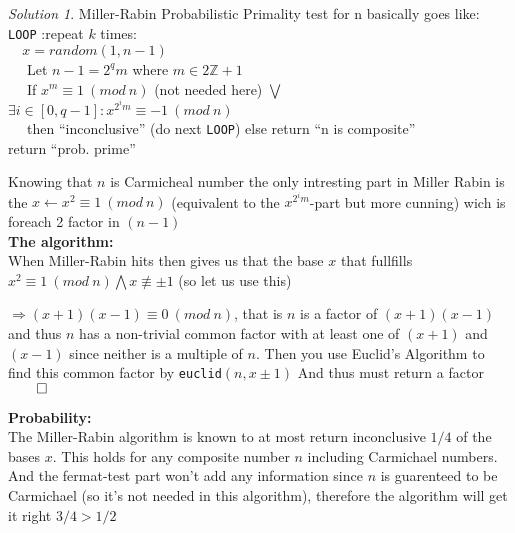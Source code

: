\documentclass[a4paper,twoside=false,abstract=false,numbers=noenddot,
titlepage=false,headings=small,parskip=half,version=last]{scrartcl}
\theoremstyle{definition}
\theoremstyle{remark}
\newtheorem*{solution}{Solution}
\newcommand{\ZZ}{\ensuremath{\mathbb{Z}}}
\begin{document}
\begin{solution}
   Miller-Rabin Probabilistic Primality test for n basically goes like: \\
   \verb+LOOP+ :repeat $k$ times:\\
   \verb+  + $x = random(1,n-1)$ \\
   \verb+  + Let $n-1 = 2^qm$ where $m \in 2\ZZ+1$ \\
   \verb+  + If $x^m \equiv 1 \ (mod \ n)$ (not needed here)
         $\bigvee$ 
         $\exists i \in [0,q-1]:x^{2^im} \equiv -1 \ (mod \ n)$ \\
   \verb+  + then ``inconclusive'' (do next \verb+LOOP+) else return ``n is composite'' \\ %
   return ``prob. prime''


   Knowing that $n$ is Carmicheal number the only intresting part in %
   Miller Rabin is the $x \leftarrow x^2 \equiv 1 \ (mod \ n)$ 
   (equivalent to the $x^{2^im}$-part but more cunning) wich is foreach 2 factor in $(n-1)$ \\ 
   
   {\bf The algorithm:} \\ %
   When Miller-Rabin hits then gives us that the base $x$ that fullfills 
   $x^2 \equiv 1 \ (mod \ n) \bigwedge x \not\equiv \pm 1$ (so let us use this)
   
   $\Rightarrow (x+1)(x-1) \equiv 0 \ (mod \ n)$, that is $n$ is a factor of $(x+1)(x-1)$
   and thus $n$ has a non-trivial common factor with at least one of $(x+1)$ and $(x-1)$
   since neither is a multiple of $n$. Then you use Euclid's Algorithm to find this common factor by \verb+euclid+$(n,x \pm 1)$
   And thus must return a factor $\qed$

   {\bf Probability: } \\
   The Miller-Rabin algorithm is known to at most return inconclusive $1/4$ of the bases $x$.
   This holds for any composite number $n$ including Carmichael numbers.
   And the fermat-test part won't add any information since $n$ 
   is guarenteed to be Carmichael (so it's not needed in this algorithm),
   therefore the algorithm will get it right \underline{$3/4>1/2$}


\end{solution}
\end{document}

